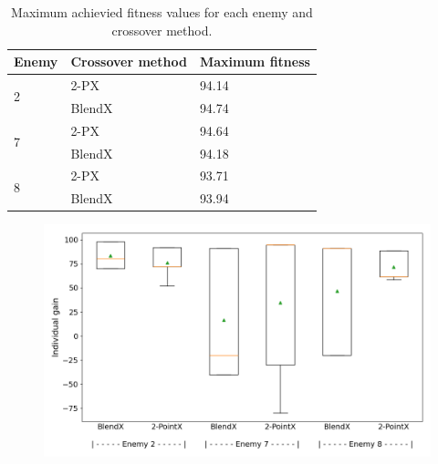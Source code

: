 \begin{table}[tbp]
    \begin{tabular}{|l|l|l|}
    \hline
    Enemy              & Crossover method & Maximum fitness \\ \hline
    \multirow{2}{*}{2} & 2-PX             & 94.14           \\ \cline{2-3}
                       & BlendX           & 94.74           \\ \hline
    \multirow{2}{*}{7} & 2-PX             & 94.64           \\ \cline{2-3}
                       & BlendX           & 94.18           \\ \hline
    \multirow{2}{*}{8} & 2-PX             & 93.71           \\ \cline{2-3}
                       & BlendX           & 93.94           \\ \hline
    \end{tabular}
\caption{Maximum achievied fitness values for each enemy and crossover method.}
\end{table}

\begin{figure}[htbp]
    \centering
    \includegraphics[width=\linewidth]{../../plots/boxplots}
    \caption{}
    \label{fig:boxplots}
\end{figure}

